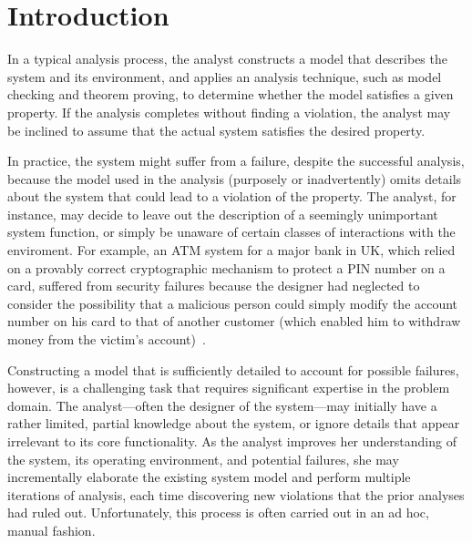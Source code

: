 
\section{Introduction}


In a typical analysis process, the analyst constructs a model that
describes the system and its environment, and applies an analysis
technique, such as model checking and theorem proving, to determine
whether the model satisfies a given property. If the analysis
completes without finding a violation, the analyst may be inclined to
assume that the actual system satisfies the desired property. 

In practice, the system might suffer from a failure, despite
the successful analysis, because the model used in the analysis
(purposely or inadvertently) omits details about the system that could
lead to a violation of the property. The analyst, for instance, may
decide to leave out the description of a seemingly unimportant system
function, or simply be unaware of certain classes of interactions with
the enviroment. For example, an ATM system for a major bank in UK,
which relied on a provably correct cryptographic mechanism to protect
a PIN number on a card, suffered from security failures because the
designer had neglected to consider the possibility that a malicious
person could simply modify the account number on his card to that
of another customer (which enabled him to withdraw money from the victim's
account)~\cite{anderson-needham}.

Constructing a model that is sufficiently detailed to account for
possible failures, however, is a challenging task that requires
significant expertise in the problem domain. The analyst---often the
designer of the system---may initially have a rather limited, partial
knowledge about the system, or ignore details that appear irrelevant
to its core functionality. As the analyst improves her understanding
of the system, its operating environment, and potential failures, she
may incrementally elaborate the existing system model and perform
multiple iterations of analysis, each time discovering new violations
that the prior analyses had ruled out. Unfortunately, this process is
often carried out in an ad hoc, manual fashion.

